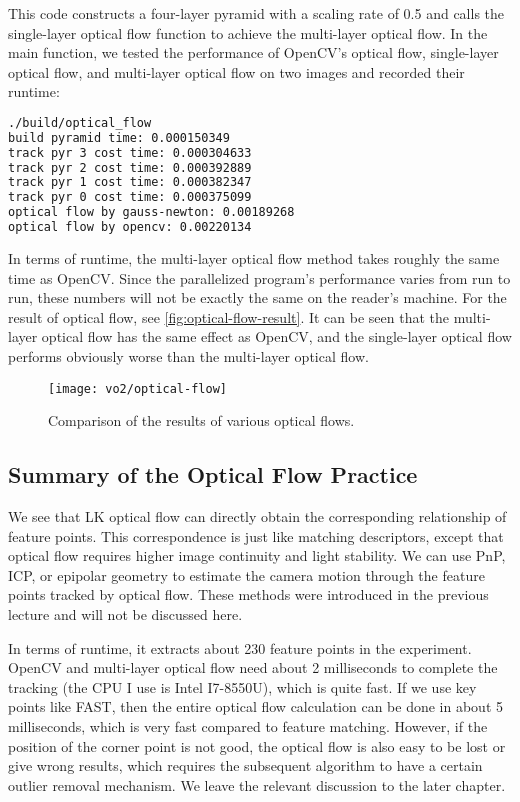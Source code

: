 This code constructs a four-layer pyramid with a scaling rate of 0.5 and calls the single-layer optical flow function to achieve the multi-layer optical flow. In the main function, we tested the performance of OpenCV's optical flow, single-layer optical flow, and multi-layer optical flow on two images and recorded their runtime:
\begin{lstlisting}[language=sh,caption=Terminal input:]
./build/optical_flow
build pyramid time: 0.000150349
track pyr 3 cost time: 0.000304633
track pyr 2 cost time: 0.000392889
track pyr 1 cost time: 0.000382347
track pyr 0 cost time: 0.000375099
optical flow by gauss-newton: 0.00189268
optical flow by opencv: 0.00220134
\end{lstlisting}
In terms of runtime, the multi-layer optical flow method takes roughly the same time as OpenCV. Since the parallelized program's performance varies from run to run, these numbers will not be exactly the same on the reader's machine. For the result of optical flow, see \autoref{fig:optical-flow-result}. It can be seen that the multi-layer optical flow has the same effect as OpenCV, and the single-layer optical flow performs obviously worse than the multi-layer optical flow.

\begin{figure}[!htp]
	\centering
	\texttt{[image: vo2/optical-flow]}
	\caption{Comparison of the results of various optical flows.}
	\label{fig:optical-flow-result}
\end{figure}

\subsection{Summary of the Optical Flow Practice}
We see that LK optical flow can directly obtain the corresponding relationship of feature points. This correspondence is just like matching descriptors, except that optical flow requires higher image continuity and light stability. We can use PnP, ICP, or epipolar geometry to estimate the camera motion through the feature points tracked by optical flow. These methods were introduced in the previous lecture and will not be discussed here.

In terms of runtime, it extracts about 230 feature points in the experiment. OpenCV and multi-layer optical flow need about 2 milliseconds to complete the tracking (the CPU I use is Intel I7-8550U), which is quite fast. If we use key points like FAST, then the entire optical flow calculation can be done in about 5 milliseconds, which is very fast compared to feature matching. However, if the position of the corner point is not good, the optical flow is also easy to be lost or give wrong results, which requires the subsequent algorithm to have a certain outlier removal mechanism. We leave the relevant discussion to the later chapter.


